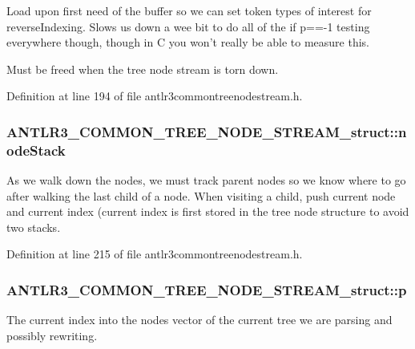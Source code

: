 Load upon first need of the buffer so we can set token types of interest for reverse\-Indexing. Slows us down a wee bit to do all of the if p==-\/1 testing everywhere though, though in C you won't really be able to measure this.

Must be freed when the tree node stream is torn down. 

Definition at line 194 of file antlr3commontreenodestream.\-h.

\hypertarget{struct_a_n_t_l_r3___c_o_m_m_o_n___t_r_e_e___n_o_d_e___s_t_r_e_a_m__struct_aede8f9dacdeca420740c4c001c2f6363}{
\subsubsection[{node\-Stack}]{ A\-N\-T\-L\-R3\-\_\-\-C\-O\-M\-M\-O\-N\-\_\-\-T\-R\-E\-E\-\_\-\-N\-O\-D\-E\-\_\-\-S\-T\-R\-E\-A\-M\-\_\-struct\-::node\-Stack}}\label{struct_a_n_t_l_r3___c_o_m_m_o_n___t_r_e_e___n_o_d_e___s_t_r_e_a_m__struct_aede8f9dacdeca420740c4c001c2f6363}
As we walk down the nodes, we must track parent nodes so we know where to go after walking the last child of a node. When visiting a child, push current node and current index (current index is first stored in the tree node structure to avoid two stacks. 

Definition at line 215 of file antlr3commontreenodestream.\-h.

\hypertarget{struct_a_n_t_l_r3___c_o_m_m_o_n___t_r_e_e___n_o_d_e___s_t_r_e_a_m__struct_a9a24030b7d64f35ff7a7053cb773846a}{
\subsubsection[{p}]{ A\-N\-T\-L\-R3\-\_\-\-C\-O\-M\-M\-O\-N\-\_\-\-T\-R\-E\-E\-\_\-\-N\-O\-D\-E\-\_\-\-S\-T\-R\-E\-A\-M\-\_\-struct\-::p}}\label{struct_a_n_t_l_r3___c_o_m_m_o_n___t_r_e_e___n_o_d_e___s_t_r_e_a_m__struct_a9a24030b7d64f35ff7a7053cb773846a}
The current index into the nodes vector of the current tree we are parsing and possibly rewriting. 


